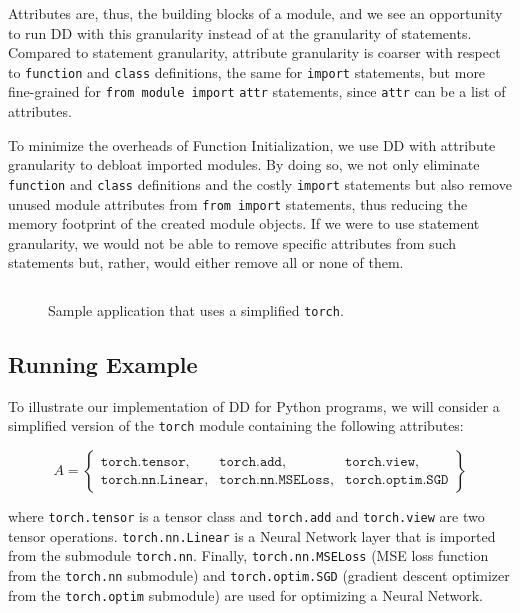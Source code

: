 \documentclass[sigplan,nonacm]{acmart}
\newcounter{example}
\newcommand{\module}[1]{{\texttt{#1}}}
\newcommand{\attribute}[1]{\texttt{#1}}
\begin{document}
Attributes are, thus, the building blocks of a module, and we see an opportunity to run DD with this granularity instead of at the granularity of statements.
Compared to statement granularity, attribute granularity is coarser with respect to \verb|function| and \verb|class| definitions, the same for \verb|import| statements, but more fine-grained for \verb|from module import| \verb|attr| statements, since \verb|attr| can be a list of attributes.

To minimize the overheads of Function Initialization, we use DD with attribute granularity to debloat imported modules.
By doing so, we not only eliminate \verb|function| and \verb|class| definitions and the costly \verb|import| statements but also remove unused module attributes from \verb|from import| statements, thus reducing the memory footprint of the created module objects.
If we were to use statement granularity, we would not be able to remove specific attributes from such statements but, rather, would either remove all or none of them.



\begin{figure}[t]
    \centering
    \inputminted[fontsize=\scriptsize]{python}{chapters/6_debloating/torch-app.py}
    \caption{Sample application that uses a simplified \module{torch}.}
    \label{fig:torch-example}
\end{figure}
 
\subsection{Running Example}

To illustrate our implementation of DD for Python programs, we will consider a simplified version of the \module{torch} module containing the following attributes:

{\footnotesize
\[
A = \left\{
\begin{array}{lll}
\attribute{torch.tensor}, & \attribute{torch.add}, &\attribute{torch.view}, \\
\attribute{torch.nn.Linear}, & \attribute{torch.nn.MSELoss}, & \attribute{torch.optim.SGD}
\end{array}
\right\}
\]
}

\noindent
where \attribute{torch.tensor} is a tensor class and \attribute{torch.add} and \attribute{torch.view} are two tensor operations.
\attribute{torch.nn.Linear} is a Neural Network layer
that is imported from the submodule \module{torch.nn}.
Finally, \attribute{torch.nn.MSELoss} (MSE loss function from the \module{torch.nn} submodule) and \attribute{torch.optim.SGD} (gradient descent optimizer from the \module{torch.optim} submodule) are used for optimizing a Neural Network.
\end{document}
